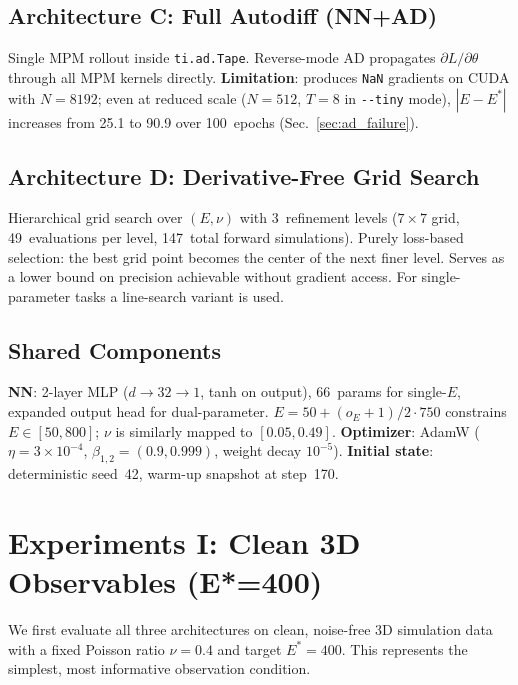 \documentclass{article}
\begin{document}
\subsection{Architecture C: Full Autodiff (NN+AD)}
\label{sec:method_ad}

Single MPM rollout inside \texttt{ti.ad.Tape}.  Reverse-mode AD propagates
$\partial L/\partial\theta$ through all MPM kernels directly.  \textbf{Limitation}:
produces \texttt{NaN} gradients on CUDA with $N=8192$; even at reduced scale
($N=512$, $T=8$ in \texttt{-\/-tiny} mode), $|E-E^*|$ increases from 25.1 to
90.9 over 100~epochs (Sec.~\ref{sec:ad_failure}).

\subsection{Architecture D: Derivative-Free Grid Search}
\label{sec:method_grid}

Hierarchical grid search over $(E,\nu)$ with 3~refinement levels
($7\times7$ grid, 49~evaluations per level, 147~total forward simulations).
Purely loss-based selection: the best grid point becomes the center of the
next finer level.  Serves as a lower bound on precision achievable without
gradient access.  For single-parameter tasks a line-search variant is used.

\subsection{Shared Components}

\textbf{NN}: 2-layer MLP ($d\to32\to1$, tanh on output), 66~params for
single-$E$, expanded output head for dual-parameter.
$E=50+(o_E+1)/2\cdot750$ constrains $E\in[50,800]$; $\nu$ is similarly
mapped to $[0.05,0.49]$.  \textbf{Optimizer}: AdamW ($\eta=3\times10^{-4}$,
$\beta_{1,2}=(0.9,0.999)$, weight decay $10^{-5}$).
\textbf{Initial state}: deterministic seed~42, warm-up snapshot at step~170.


\section{Experiments I: Clean 3D Observables (E*=400)}
\label{sec:clean3d}

We first evaluate all three architectures on clean, noise-free 3D simulation
data with a fixed Poisson ratio $\nu=0.4$ and target $E^*=400$.  This
represents the simplest, most informative observation condition.
\end{document}
